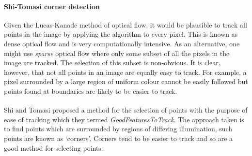\paragraph{Shi-Tomasi corner detection}
Given the Lucas-Kanade method of optical flow, it would be plausible to track all points in the image by applying the algorithm to every pixel. This is known as dense optical flow and is very computationally intensive.
 As an alternative, one might use \textit{sparse} optical flow where only some subset of all the pixels in the image are tracked. 
The selection of this subset is non-obvious. It is clear, however, that not all points in an image are equally easy to track. For example, a pixel surrounded by a large region of uniform colour cannot be easily followed but points
found at boundaries are likely to be easier to track. 
\\\\
Shi and Tomasi \cite{ShiTomasi} proposed a method for the selection of points with the purpose of ease of tracking which they termed \textit{GoodFeaturesToTrack}. 
The approach taken is to find points which are surrounded by regions of differing illumination, such points are known as `corners'. Corners tend to be easier to track
and so are a good method for selecting points.



